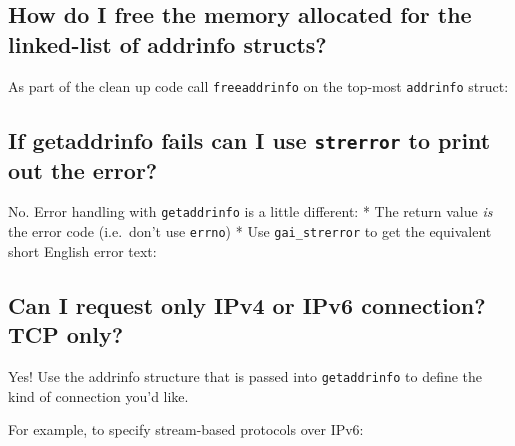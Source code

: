 \subsection{How do I free the memory allocated for the linked-list of
addrinfo
structs?}\label{how-do-i-free-the-memory-allocated-for-the-linked-list-of-addrinfo-structs}

As part of the clean up code call \texttt{freeaddrinfo} on the top-most
\texttt{addrinfo} struct:

\begin{Shaded}
\begin{Highlighting}[]
  
\end{Highlighting}
\end{Shaded}

\subsection{\texorpdfstring{If getaddrinfo fails can I use
\texttt{strerror} to print out the
error?}{If getaddrinfo fails can I use strerror to print out the error?}}\label{if-getaddrinfo-fails-can-i-use-strerror-to-print-out-the-error}

No. Error handling with \texttt{getaddrinfo} is a little different: *
The return value \emph{is} the error code (i.e.~don't use
\texttt{errno}) * Use \texttt{gai\_strerror} to get the equivalent short
English error text:

\begin{Shaded}
\begin{Highlighting}[]
 
     
\NormalTok{\}}
\end{Highlighting}
\end{Shaded}

\subsection{Can I request only IPv4 or IPv6 connection? TCP
only?}\label{can-i-request-only-ipv4-or-ipv6-connection-tcp-only}

Yes! Use the addrinfo structure that is passed into \texttt{getaddrinfo}
to define the kind of connection you'd like.

For example, to specify stream-based protocols over IPv6:

